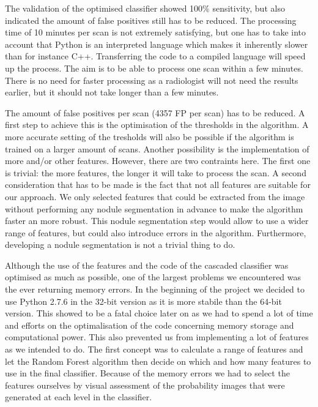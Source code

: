 The validation of the optimised classifier showed 100\% sensitivity, but also
indicated the amount of false positives still has to be reduced. The processing
time of 10 minutes per scan is not extremely satisfying, but one has to take
into account that Python is an interpreted language which makes it inherently
slower than for instance C++. Transferring the code to a compiled language will
speed up the process. The aim is to be able to process one scan within a few
minutes. There is no need for faster processing as a radiologist will not need
the results earlier, but it should not take longer than a few minutes.

The amount of false positives per scan (4357 FP per scan) has to be reduced. A
first step to achieve this is the optimisation of the thresholds in the
algorithm. A more accurate setting of the tresholds will also be possible if the
algorithm is trained on a larger amount of scans. Another possibility is the
implementation of more and/or other features. However, there are two contraints
here. The first one is trivial: the more features, the longer it will take to
process the scan. A second consideration that has to be made is the fact that
not all features are suitable for our approach. We only selected features that
could be extracted from the image without performing any nodule segmentation in
advance to make the algorithm faster an more robust. This nodule segmentation
step would allow to use a wider range of features, but could also introduce
errors in the algorithm. Furthermore, developing a nodule segmentation is not a
trivial thing to do.

Although the use of the features and the code of the cascaded classifier was
optimised as much as possible, one of the largest problems we encountered was
the ever returning memory errors. In the beginning of the project we decided to
use Python 2.7.6 in the 32-bit version as it is more stabile than the 64-bit
version. This showed to be a fatal choice later on as we had to spend a lot of
time and efforts on the optimalisation of the code concerning memory storage and
computational power. This also prevented us from implementing a lot of features
as we intended to do. The first concept was to calculate a range of features and
let the Random Forest algorithm then decide on which and how many features to
use in the final classifier. Because of the memory errors we had to select the
features ourselves by visual assessment of the probability images that were
generated at each level in the classifier.

